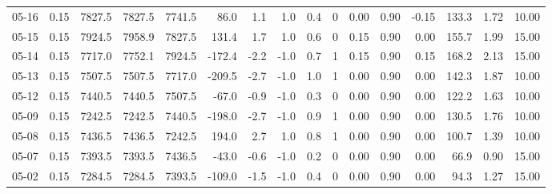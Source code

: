 \begin{threeparttable}
{\begin{tabular}{lrrrrrrrrrrrrrrr}
  05-16 &     0.15 & 7827.5 & 7827.5 & 7741.5 &       86.0 &            1.1 &                      1.0 &                 0.4 &              0 &       0.00 &      0.90 &          -0.15 &            133.3 &            1.72 &                  10.00 \\
  05-15 &     0.15 & 7924.5 & 7958.9 & 7827.5 &      131.4 &            1.7 &                      1.0 &                 0.6 &              0 &       0.15 &      0.90 &           0.00 &            155.7 &            1.99 &                  15.00 \\
  05-14 &     0.15 & 7717.0 & 7752.1 & 7924.5 &     -172.4 &           -2.2 &                     -1.0 &                 0.7 &              1 &       0.15 &      0.90 &           0.15 &            168.2 &            2.13 &                  15.00 \\
  05-13 &     0.15 & 7507.5 & 7507.5 & 7717.0 &     -209.5 &           -2.7 &                     -1.0 &                 1.0 &              1 &       0.00 &      0.90 &           0.00 &            142.3 &            1.87 &                  10.00 \\
  05-12 &     0.15 & 7440.5 & 7440.5 & 7507.5 &      -67.0 &           -0.9 &                     -1.0 &                 0.3 &              0 &       0.00 &      0.90 &           0.00 &            122.2 &            1.63 &                  10.00 \\
  05-09 &     0.15 & 7242.5 & 7242.5 & 7440.5 &     -198.0 &           -2.7 &                     -1.0 &                 0.9 &              1 &       0.00 &      0.90 &           0.00 &            130.5 &            1.76 &                  10.00 \\
  05-08 &     0.15 & 7436.5 & 7436.5 & 7242.5 &      194.0 &            2.7 &                      1.0 &                 0.8 &              1 &       0.00 &      0.90 &           0.00 &            100.7 &            1.39 &                  10.00 \\
  05-07 &     0.15 & 7393.5 & 7393.5 & 7436.5 &      -43.0 &           -0.6 &                     -1.0 &                 0.2 &              0 &       0.00 &      0.90 &           0.00 &             66.9 &            0.90 &                  15.00 \\
  05-02 &     0.15 & 7284.5 & 7284.5 & 7393.5 &     -109.0 &           -1.5 &                     -1.0 &                 0.4 &              0 &       0.00 &      0.90 &           0.00 &             94.3 &            1.27 &                  15.00 \\

\end{tabular}}
\end{threeparttable}
